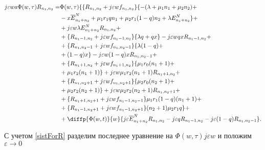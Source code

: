  \begin{equation*}
	\begin{split}
		j\varepsilon wa \Phi (w,\tau)R_{n_{1}, n_{2}}=
		&\Phi (w,\tau)\{\{R_{n_{1}, n_{2}}+j\varepsilon w f_{n_{1}, n_{2}}\}\{-(\lambda+\mu_{1}n_{1}+\mu_{2}n_{2}) +\\
		&-x\overline{E}_{n_{1}+n_{2}}^N+\mu_{1}r_{1}q n_{1}+ \mu_{2}r_{1}(1-q)n_{2}+ \lambda E_{n_{1}+n_{2}}^N\} +\\
		&+j\varepsilon w \lambda E_{n_{1}+n_{2}}^NR_{n_{1}, n_{2}} +\\
		&+\{R_{n_{1}-1, n_{2}}+j\varepsilon w f_{n_{1}-1, n_{2}}\}\{\lambda q+ q  x\}-j\varepsilon wq xR_{n_{1}-1, n_{2}}+\\
		&+\{R_{n_{1}, n_{2}-1}+j\varepsilon w f_{n_{1}, n_{2}-1}\}\{\lambda (1-q) +\\
		&+ (1-q) x\} -j\varepsilon w(1-q) xR_{n_{1}, n_{2}-1} +\\
		&+ \{R_{n_{1}+1, n_{2}}+j\varepsilon w f_{n_{1}+1, n_{2}}\}\{\mu_{1} r_{0}(n_{1}+1)+\\
		& + \mu_{1} r_{2}(n_{1}+1)\}+j\varepsilon w\mu_{1} r_{2}(n_{1}+1)R_{n_{1}+1, n_{2}}+\\
		&+ \{R_{n_{1}, n_{2}+1}+j\varepsilon w f_{n_{1}, n_{2}+1}\}\{\mu_{2} r_{0}(n_{2}+1)+\\
		& + \mu_{2} r_{2} (n_{2}+1)\} +j\varepsilon w\mu_{2} r_{2} (n_{2}+1)R_{n_{1}, n_{2}+1}+\\
		&+\{R_{n_{1}+1, n_{2}+1}+j\varepsilon w f_{n_{1}-1, n_{2}-1}\}\mu_{1} r_{1}(1-q)(n_{1}+1) +\\
		&+\{R_{n_{1}-1, n_{2}+1}+j\varepsilon w f_{n_{1}-1, n_{2}+1}\}(n_{2}+1)\mu_{2} r_{1}q\}  +\\
		&+ \diffp{\Phi(w,t)}{w}\{j\varepsilon \overline{E}_{n_{1}+n_{2}}^NR_{n_{1}, n_{2}}-  j\varepsilon q R_{n_{1}-1, n_{2}}-j \varepsilon (1-q) R_{n_{1}, n_{2}-1}\}.
	\end{split}
\end{equation*}

С учетом \eqref{sistForR} разделим последнее уравнение на $\Phi (w, \tau)j\varepsilon w$ и положим $\varepsilon \rightarrow 0$

